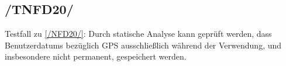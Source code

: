 \subsection*{/TNFD20/}
\label{/TNFD20/} Testfall zu \ref{/NFD20/}: Durch \gls{statische Analyse} kann geprüft werden, dass \Glspl{Benutzerdatum} bezüglich \Gls{GPS} ausschließlich während der Verwendung, und insbesondere nicht permanent, gespeichert werden.